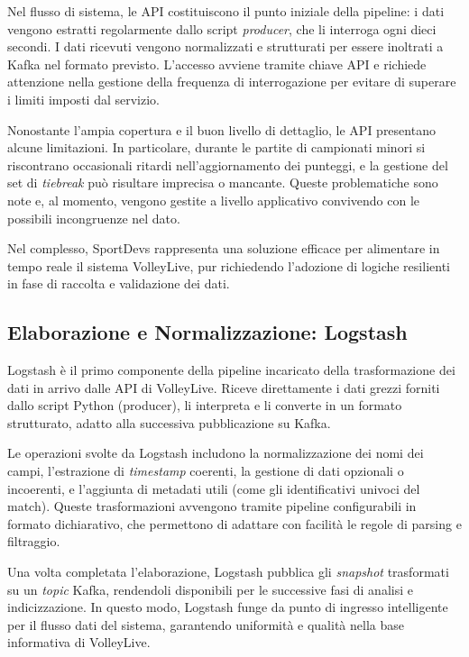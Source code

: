 \documentclass[a4paper,12pt]{report}
\begin{document}
Nel flusso di sistema, le API costituiscono il punto iniziale della pipeline: i dati vengono estratti regolarmente dallo script \textit{producer}, che li interroga ogni dieci secondi. I dati ricevuti vengono normalizzati e strutturati per essere inoltrati a Kafka nel formato previsto. L'accesso avviene tramite chiave API e richiede attenzione nella gestione della frequenza di interrogazione per evitare di superare i limiti imposti dal servizio.

Nonostante l’ampia copertura e il buon livello di dettaglio, le API presentano alcune limitazioni. In particolare, durante le partite di campionati minori si riscontrano occasionali ritardi nell’aggiornamento dei punteggi, e la gestione del set di \textit{tiebreak} può risultare imprecisa o mancante. Queste problematiche sono note e, al momento, vengono gestite a livello applicativo convivendo con le possibili incongruenze nel dato.

Nel complesso, SportDevs rappresenta una soluzione efficace per alimentare in tempo reale il sistema VolleyLive, pur richiedendo l’adozione di logiche resilienti in fase di raccolta e validazione dei dati.

\subsection{Elaborazione e Normalizzazione: Logstash}

Logstash è il primo componente della pipeline incaricato della trasformazione dei dati in arrivo dalle API di VolleyLive. Riceve direttamente i dati grezzi forniti dallo script Python (producer), li interpreta e li converte in un formato strutturato, adatto alla successiva pubblicazione su Kafka.

Le operazioni svolte da Logstash includono la normalizzazione dei nomi dei campi, l’estrazione di \textit{timestamp} coerenti, la gestione di dati opzionali o incoerenti, e l’aggiunta di metadati utili (come gli identificativi univoci del match). Queste trasformazioni avvengono tramite pipeline configurabili in formato dichiarativo, che permettono di adattare con facilità le regole di parsing e filtraggio.

Una volta completata l’elaborazione, Logstash pubblica gli \textit{snapshot} trasformati su un \textit{topic} Kafka, rendendoli disponibili per le successive fasi di analisi e indicizzazione. In questo modo, Logstash funge da punto di ingresso intelligente per il flusso dati del sistema, garantendo uniformità e qualità nella base informativa di VolleyLive.
\end{document}
